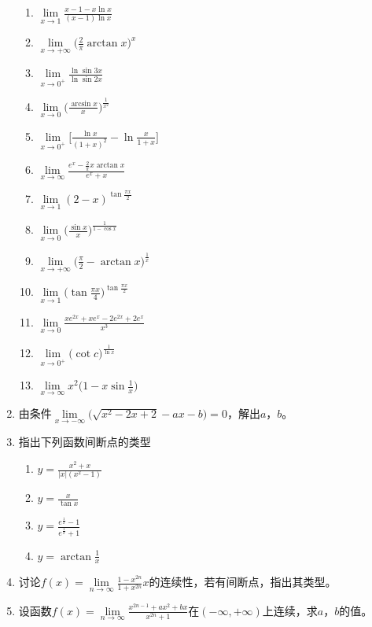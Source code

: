 \begin{enumerate}
\begin{enumerate}[(1)]
            \item $\lim\limits_{x \to 1} \frac{x-1-x\ln x}{(x-1)\ln x}$
            \item $\lim\limits_{x \to +\infty} \big(\frac{2}{\pi}\arctan x\big)^x$
            \item $\lim\limits_{x \to 0^+} \frac{\ln \sin 3x}{\ln \sin 2x}$
            \item $\lim\limits_{x \to 0} \big(\frac{\arcsin x}{x}\big)^{\frac{1}{x^2}}$
            \item $\lim\limits_{x \to 0^+} \big[\frac{\ln x}{(1+x)^2}-\ln \frac{x}{1+x}\big]$
            \item $\lim\limits_{x \to \infty} \frac{e^x-\frac{2}{\pi} x \arctan x}{e^x + x}$
            \item $\lim\limits_{x \to 1} (2-x)^{\tan \frac{\pi x}{2}}$
            \item $\lim\limits_{x \to 0} \big(\frac{\sin x}{x}\big)^{\frac{1}{1-\cos x}}$
            \item $\lim\limits_{x \to +\infty} \big(\frac{\pi}{2}-\arctan x\big)^{\frac{1}{x}}$
            \item $\lim\limits_{x \to 1} \big(\tan \frac{\pi x}{4}\big)^{\tan \frac{\pi x}{2}}$
            \item $\lim\limits_{x \to 0} \frac{x e^{2x} + x e^x -2e^{2x}+ 2e^x}{x^3}$
            \item $\lim\limits_{x \to 0^+} \big(\cot c \big)^{\frac{1}{\ln x}}$
            \item $\lim\limits_{x \to \infty} x^2\big(1-x\sin\frac{1}{x}\big)$
        \end{enumerate}
    \item 由条件$\lim\limits_{x \to -\infty}\big(\sqrt{x^2-2x+2}-ax-b\big)=0$，解出$a$，$b$。
    \item 指出下列函数间断点的类型
        \begin{enumerate}[(1)]
            \item $y=\frac{x^2+x}{\left|x\right|(x^2-1)}$
            \item $y=\frac{x}{\tan x}$
            \item $y=\frac{e^{\frac{1}{x}}-1}{e^{\frac{1}{x}}+1}$
            \item $y=\arctan \frac{1}{x}$
        \end{enumerate}
    \item 讨论$f(x)=\lim\limits_{n\to \infty}\frac{1-x^{2n}}{1+x^{2n}}x$的连续性，若有间断点，指出其类型。
    \item 设函数$f(x)=\lim\limits_{n \to \infty}\frac{x^{2n-1}+ax^2+bx}{x^{2n}+1}$在$(-\infty,+\infty)$上连续，求$a$，$b$的值。

\end{enumerate}
